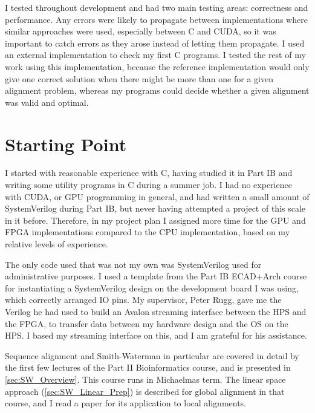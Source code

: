 I tested throughout development and had two main testing areas: correctness and performance. Any errors were likely to propagate between implementations where similar approaches were used, especially between C and CUDA, so it was important to catch errors as they arose instead of letting them propagate.
I used an external implementation \cite{EMBOSS} to check my first C programs.
I tested the rest of my work using this implementation, because the reference implementation would only give one correct solution when there might be more than one for a given alignment problem, whereas my programs could decide whether a given alignment was valid and optimal.

\section{Starting Point}
\label{sec:Starting_Point}

I started with reasonable experience with C, having studied it in Part IB and writing some utility programs in C during a summer job. I had no experience with CUDA, or GPU programming in general, and had written a small amount of SystemVerilog during Part IB, but never having attempted a project of this scale in it before.
Therefore, in my project plan I assigned more time for the GPU and FPGA implementations compared to the CPU implementation, based on my relative levels of experience.

The only code used that was not my own was SystemVerilog used for administrative purposes.
I used a template from the Part IB ECAD+Arch course for instantiating a SystemVerilog design on the development board I was using, which correctly arranged IO pins.
My supervisor, Peter Rugg, gave me the Verilog he had used to build an Avalon streaming interface between the HPS and the FPGA, to transfer data between my hardware design and the OS on the HPS.
I based my streaming interface on this, and I am grateful for his assistance.

Sequence alignment and Smith-Waterman in particular are covered in detail by the first few lectures of the Part II Bioinformatics course, and is presented in \cref{sec:SW_Overview}.
This course runs in Michaelmas term.
The linear space approach (\cref{sec:SW_Linear_Prep}) is described for global alignment in that course, and I read a paper \cite{MyersMiller} for its application to local alignments.
